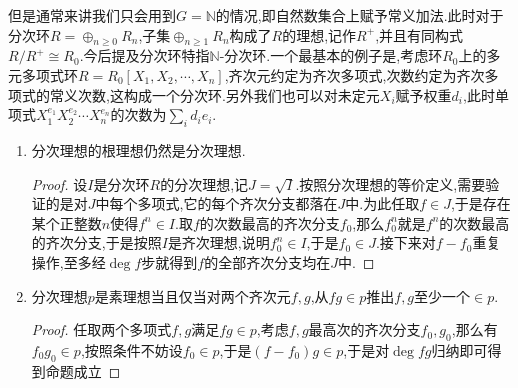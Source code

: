 但是通常来讲我们只会用到$G=\mathbb{N}$的情况,即自然数集合上赋予常义加法.此时对于分次环$R=\oplus_{n\ge0}R_n$,子集$\oplus_{n\ge1}R_n$构成了$R$的理想,记作$R^+$,并且有同构式$R/R^+\cong R_0$.今后提及分次环特指$\mathbb{N}$-分次环.一个最基本的例子是,考虑环$R_0$上的多元多项式环$R=R_0[X_1,X_2,\cdots,X_n]$,齐次元约定为齐次多项式,次数约定为齐次多项式的常义次数,这构成一个分次环.另外我们也可以对未定元$X_i$赋予权重$d_i$,此时单项式$X_1^{e_1}X_2^{e_2}\cdots X_n^{e_n}$的次数为$\sum_i d_ie_i$.
\begin{enumerate}
	\item 分次理想的根理想仍然是分次理想.
	\begin{proof}
		
		设$I$是分次环$R$的分次理想,记$J=\sqrt{I}$.按照分次理想的等价定义,需要验证的是对$J$中每个多项式,它的每个齐次分支都落在$J$中.为此任取$f\in J$,于是存在某个正整数$n$使得$f^n\in I$.取$f$的次数最高的齐次分支$f_0$,那么$f_0^n$就是$f^n$的次数最高的齐次分支,于是按照$I$是齐次理想,说明$f_0^n\in I$,于是$f_0\in J$.接下来对$f-f_0$重复操作,至多经$\deg f$步就得到$f$的全部齐次分支均在$J$中.
	\end{proof}
	\item 分次理想$p$是素理想当且仅当对两个齐次元$f,g$,从$fg\in p$推出$f,g$至少一个$\in p$.
	\begin{proof}
		
		任取两个多项式$f,g$满足$fg\in p$,考虑$f,g$最高次的齐次分支$f_0,g_0$,那么有$f_0g_0\in p$,按照条件不妨设$f_0\in p$,于是$(f-f_0)g\in p$,于是对$\deg fg$归纳即可得到命题成立
	\end{proof}
\end{enumerate}

